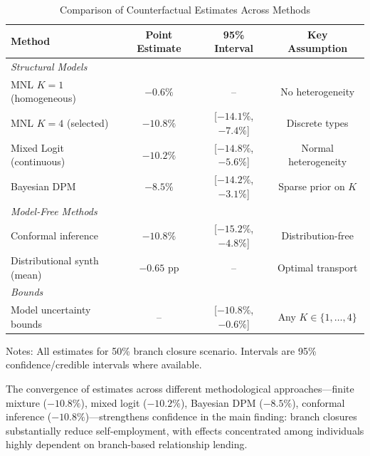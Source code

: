 \documentclass[12pt]{article}
\begin{document}
\begin{table}[H]
\centering
\caption{Comparison of Counterfactual Estimates Across Methods}
\label{tab:method_comparison}
\begin{threeparttable}
\begin{tabular}{lccc}
\toprule
Method & Point Estimate & 95\% Interval & Key Assumption \\
\midrule
\multicolumn{4}{l}{\textit{Structural Models}} \\
MNL $K=1$ (homogeneous) & $-0.6\%$ & -- & No heterogeneity \\
MNL $K=4$ (selected) & $-10.8\%$ & [$-14.1\%$, $-7.4\%$] & Discrete types \\
Mixed Logit (continuous) & $-10.2\%$ & [$-14.8\%$, $-5.6\%$] & Normal heterogeneity \\
Bayesian DPM & $-8.5\%$ & [$-14.2\%$, $-3.1\%$] & Sparse prior on $K$ \\
\midrule
\multicolumn{4}{l}{\textit{Model-Free Methods}} \\
Conformal inference & $-10.8\%$ & [$-15.2\%$, $-4.8\%$] & Distribution-free \\
Distributional synth (mean) & $-0.65$ pp & -- & Optimal transport \\
\midrule
\multicolumn{4}{l}{\textit{Bounds}} \\
Model uncertainty bounds & -- & [$-10.8\%$, $-0.6\%$] & Any $K \in \{1,\ldots,4\}$ \\
\bottomrule
\end{tabular}
\begin{tablenotes}
\small
\item Notes: All estimates for 50\% branch closure scenario. Intervals are 95\% confidence/credible intervals where available.
\end{tablenotes}
\end{threeparttable}
\end{table}

The convergence of estimates across different methodological approaches---finite mixture ($-10.8\%$), mixed logit ($-10.2\%$), Bayesian DPM ($-8.5\%$), conformal inference ($-10.8\%$)---strengthens confidence in the main finding: branch closures substantially reduce self-employment, with effects concentrated among individuals highly dependent on branch-based relationship lending.
\end{document}
